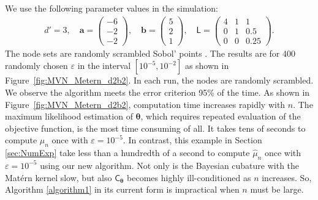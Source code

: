 \documentclass[twocolumn]{svjour3}          %
\newcommand{\bm}[1]{\boldsymbol{#1}}
\newcommand{\vtheta}{{\bm{\theta}}}
\newcommand{\va}{\bm{a}}
\newcommand{\vb}{\bm{b}}
\newcommand{\mC}{\mathsf{C}}
\newcommand{\mL}{\mathsf{L}}
\newcommand{\hmu}{\widehat{\mu}}
\newcommand\figref{Figure~\ref}
\newcommand{\FJHNote}[1]{{\textcolor{blue}{FJH: #1}}}
\newcommand{\JRNote}[1]{{\textcolor{green}{JR: #1}}}
\begin{document}
We use the following parameter values in the simulation: 
\begin{align*}
d' = 3, \quad \va = \begin{pmatrix}
-6 \\ -2 \\ -2
\end{pmatrix}, \quad 
\vb = \begin{pmatrix}
5 \\ 2 \\ 1
\end{pmatrix} , \quad 
\mL = \begin{pmatrix}
4 & 1 & 1 \\ 0 & 1 & 0.5 \\ 0 & 0 & 0.25
\end{pmatrix}.
\end{align*}
The node sets are randomly scrambled Sobol' points \cite{DicEtal14a,DicPil10a}.  The results are for 400 randomly chosen $\varepsilon$ in the interval $[10^{-5}, 10^{-2}]$ as shown in \figref{fig:MVN_Metern_d2b2}. In each run, the nodes are randomly scrambled.  We  observe the algorithm meets the error criterion 95\% of the time.
As shown in \figref{fig:MVN_Metern_d2b2}, computation time increases rapidly with $n$. 
The  maximum likelihood estimation of $\vtheta$, which requires repeated evaluation of the objective function, is the most time consuming of all. It takes tens of seconds to compute $\hmu_n$ once with $\varepsilon = 10^{-5}$.   In contrast, this example in Section \ref{sec:NumExp} take less than a hundredth of a second to compute $\hmu_n$ once with $\varepsilon = 10^{-5}$ using our new algorithm. Not only is the Bayesian cubature with the Mat\'ern kernel slow, but also $\mC_\vtheta$ becomes highly ill-conditioned as $n$ increases.
So, Algorithm \ref{algorithm1}  in its current form is impractical when $n$ must be large. 
\end{document}

